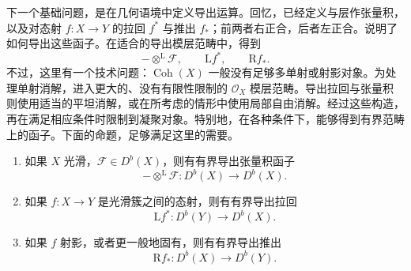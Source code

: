 下一个基础问题，是在几何语境中定义导出运算。回忆，已经定义与层作张量积，以及对态射 $f\colon X\to Y$ 的拉回 $f^*$ 与推出 $f_*$；前两者右正合，后者左正合。说明了如何导出这些函子。在适合的导出模层范畴中，得到
\[
-\otimes^{\mathrm{L}}\mathcal{F},\qquad
\mathrm{L}f^*,\qquad\mathrm{R}f_*.
\]
不过，这里有一个技术问题：$\operatorname{Coh}(X)$ 一般没有足够多单射或射影对象。为处理单射消解，进入更大的、没有有限性限制的 $\mathcal{O}_X$ 模层范畴。导出拉回与张量积则使用适当的平坦消解，或在所考虑的情形中使用局部自由消解。经过这些构造，再在满足相应条件时限制到凝聚对象。特别地，在各种条件下，能够得到有界范畴上的函子。下面的命题，足够满足这里的需要。

\begin{proposition}\label{prop:4.60}
\begin{enumerate}[label=(\arabic*)]
\item 如果 $X$ 光滑，$\mathcal{F}\in D^b(X)$，则有有界导出张量积函子
\[
-\otimes^{\mathrm{L}}\mathcal{F}\colon D^b(X)\longrightarrow D^b(X).
\]
\item 如果 $f\colon X\to Y$ 是光滑簇之间的态射，则有有界导出拉回
\[
\mathrm{L}f^*\colon D^b(Y)\longrightarrow D^b(X).
\]
\item 如果 $f$ 射影，或者更一般地固有，则有有界导出推出
\[
\mathrm{R}f_*\colon D^b(X)\longrightarrow D^b(Y).
\]
\end{enumerate}
\end{proposition}

